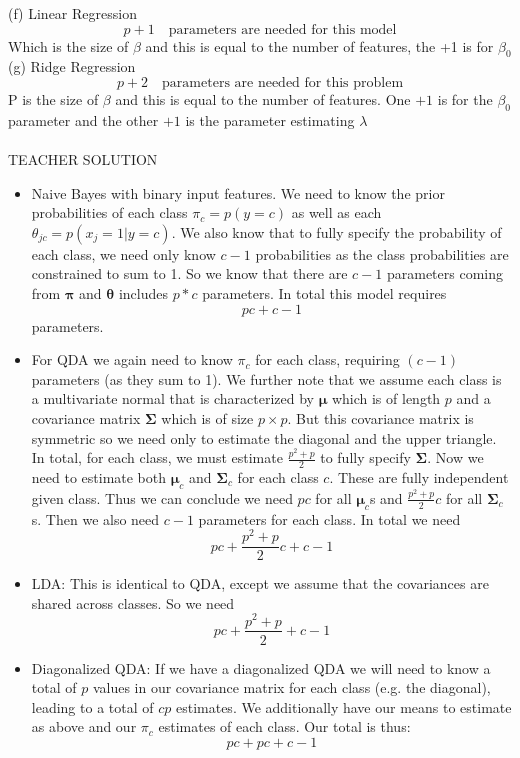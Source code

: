 \documentclass[draft]{exam} %
\theoremstyle{definition} \newtheorem*{defn}{Definition}
\begin{document}
\begin{questions}
\begin{solution}
(f) Linear Regression \\
$$p+1 \quad \text{parameters are needed for this model}$$
Which is the size of $\beta$ and this is equal to the number of features, the +1 is for $\beta_0$\\

(g) Ridge Regression \\
$$p+2 \quad \text{parameters are needed for this problem}$$
P is the size of $\beta$ and this is equal to the number of features.  One $+1$ is for the $\beta_0$ parameter and the other $+1$ is the parameter estimating $\lambda$
\\\\
TEACHER SOLUTION
  \begin{itemize}
    \item Naive Bayes with binary input features. We need to know the
    prior probabilities of each class $\pi_c = p(y=c)$ as well as
    each $\theta_{jc} = p(x_j=1|y=c)$. We also know that to fully
    specify the probability of each class, we need only know $c-1$
    probabilities as the class probabilities are constrained to sum to
    1. So we know that there are $c-1$ parameters coming from $\pmb{\pi}$
    and $\pmb{\theta}$ includes $p*c$ parameters. In total this model
    requires \[pc + c - 1\] parameters.

    \item For QDA we again need to know $\pi_c$ for each class, requiring
    $(c-1)$ parameters (as they sum to 1). We further note that we assume
    each class is a multivariate normal that is characterized by $\pmb{\mu}$
    which is of length $p$ and a covariance matrix $\pmb{\Sigma}$ which is of
    size $p \times p$. But this covariance matrix is symmetric so we need
    only to estimate the diagonal and the upper triangle. In total, for each
    class, we must estimate $\frac{p^2+p}{2}$ to fully specify
    $\pmb{\Sigma}$. Now we need to estimate both $\pmb{\mu}_c$ and $\pmb{\Sigma}_c$
    for each class $c$. These are fully independent given class. Thus we can
    conclude we need $pc$ for all $\pmb{\mu}_c$s and $\frac{p^2+p}{2}c$ for
    all $\pmb{\Sigma}_c$s. Then we also need $c-1$ parameters for each class.
    In total we need
    \[pc+\frac{p^2+p}{2}c+ c-1\]

    \item LDA: This is identical to QDA, except we assume that the
    covariances are shared across classes. So we need
    \[pc+\frac{p^2+p}{2}+ c-1\]

    \item Diagonalized QDA: If we have a diagonalized QDA we will need to
    know a total of $p$ values in our covariance matrix for each class (e.g.
    the diagonal), leading to a total of $cp$ estimates. We additionally
    have our means to estimate as above and our $\pi_c$ estimates of each
    class. Our total is thus: 
    \[pc+pc+c-1\]


\end{itemize}
\end{solution}
\end{questions}
\end{document}
